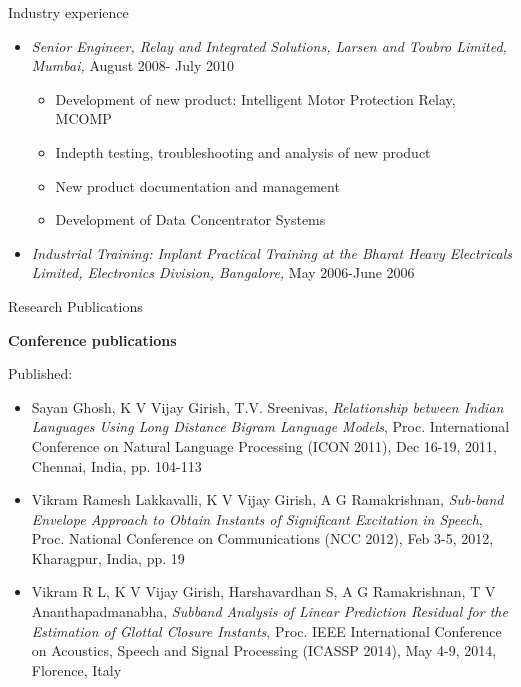 \documentclass[10pt]{article}
\begin{document}
\begin{cv}
\begin{cvlist}{Industry experience}
\begin{itemize}
	\item \emph{Senior Engineer, Relay and Integrated
	Solutions, Larsen and Toubro Limited, Mumbai,} August 2008- July 2010 
\begin{itemize}
 \item
Development of new product: Intelligent Motor Protection Relay, MCOMP
\item
Indepth testing, troubleshooting and analysis of new product
\item
New product documentation and management
\item
Development of Data Concentrator Systems

\end{itemize}




\item
\emph{Industrial Training:
Inplant Practical Training at the Bharat Heavy
Electricals Limited, Electronics Division, Bangalore,}
May 2006-June 2006


	
\end{itemize}



\end{cvlist}

\begin{cvlist}{Research Publications}
\item \textbf{Conference publications}
\item Published:
	\begin{itemize}\itemsep=0.25em
	\item Sayan Ghosh, K V Vijay Girish, T.V. Sreenivas, \textit{Relationship between Indian Languages Using Long Distance Bigram Language Models}, Proc. International Conference on Natural Language Processing (ICON
2011), Dec 16-19, 2011, Chennai, India, pp. 104-113


\item
Vikram Ramesh Lakkavalli, K V Vijay Girish, A G Ramakrishnan, \textit{Sub-band Envelope Approach to Obtain Instants of Significant Excitation in Speech}, Proc. National Conference on Communications (NCC 2012), Feb 3-5, 2012, Kharagpur, India, pp. 19

\item Vikram R L, K V Vijay Girish, Harshavardhan S, A G Ramakrishnan, T V Ananthapadmanabha, 
\textit{Subband Analysis of Linear Prediction Residual for the Estimation of Glottal Closure Instants}, Proc. IEEE International Conference on Acoustics, Speech and Signal Processing (ICASSP 2014), May 4-9, 2014, Florence, Italy


\end{itemize}
\end{cvlist}
\end{cv}
\end{document}
